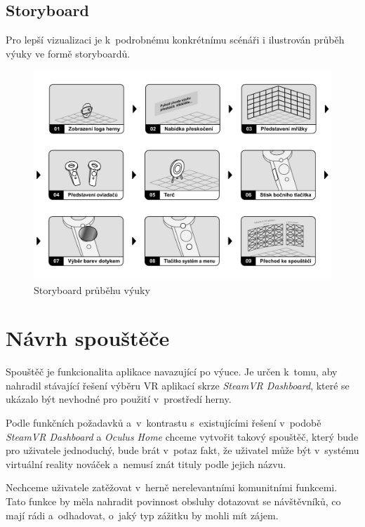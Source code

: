 \subsection{Storyboard}\label{storyboards}

Pro lepší vizualizaci je k~podrobnému konkrétnímu scénáři i ilustrován
průběh výuky ve formě storyboardů.

\begin{figure}[h!]
\centering
\includegraphics[width=\textwidth]{src/assets/storyboard.pdf}
\caption{Storyboard průběhu výuky}
\end{figure}

\section{Návrh spouštěče}\label{nuxe1vrh-spouux161tux11bux10de}

Spouštěč je funkcionalita aplikace navazující po výuce. Je určen k~tomu,
aby nahradil stávající řešení výběru VR aplikací skrze \emph{SteamVR
Dashboard}, které se ukázalo být nevhodné pro použití v~prostředí herny.

Podle funkčních požadavků a~v~kontrastu s~existujícími řešení v~podobě
\emph{SteamVR Dashboard} a \emph{Oculus Home} chceme vytvořit takový
spouštěč, který bude pro uživatele jednoduchý, bude brát v~potaz fakt,
že uživatel může být v~systému virtuální reality nováček a~nemusí
znát tituly podle jejich názvu. 

Nechceme uživatele zatěžovat v~herně
nerelevantními komunitními funkcemi. Tato funkce by měla nahradit
povinnost obsluhy dotazovat se návštěvníků, co mají rádi a~odhadovat,
o~jaký typ zážitku by mohli mít zájem.

